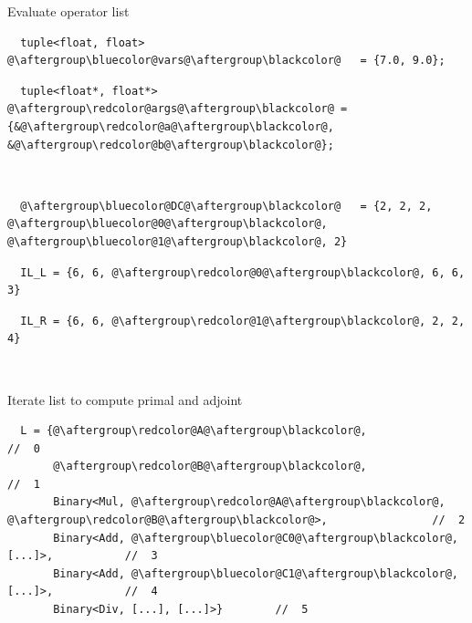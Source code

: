 \documentclass[xcolor=dvipsnames]{beamer}
\begin{document}
\begin{frame}[fragile]{Evaluate operator list}
\begin{lstlisting}
  tuple<float, float> @\aftergroup\bluecolor@vars@\aftergroup\blackcolor@   = {7.0, 9.0};
\end{lstlisting}
\begin{lstlisting}
  tuple<float*, float*> @\aftergroup\redcolor@args@\aftergroup\blackcolor@ = {&@\aftergroup\redcolor@a@\aftergroup\blackcolor@, &@\aftergroup\redcolor@b@\aftergroup\blackcolor@};
\end{lstlisting}

~

\begin{lstlisting}
  @\aftergroup\bluecolor@DC@\aftergroup\blackcolor@   = {2, 2, 2, @\aftergroup\bluecolor@0@\aftergroup\blackcolor@, @\aftergroup\bluecolor@1@\aftergroup\blackcolor@, 2}
\end{lstlisting}
\begin{lstlisting}
  IL_L = {6, 6, @\aftergroup\redcolor@0@\aftergroup\blackcolor@, 6, 6, 3}
\end{lstlisting}
\begin{lstlisting}
  IL_R = {6, 6, @\aftergroup\redcolor@1@\aftergroup\blackcolor@, 2, 2, 4}
\end{lstlisting}

~

Iterate list to compute primal and adjoint
\begin{lstlisting}
  L = {@\aftergroup\redcolor@A@\aftergroup\blackcolor@,                                //  0
       @\aftergroup\redcolor@B@\aftergroup\blackcolor@,                                //  1
       Binary<Mul, @\aftergroup\redcolor@A@\aftergroup\blackcolor@, @\aftergroup\redcolor@B@\aftergroup\blackcolor@>,                //  2
       Binary<Add, @\aftergroup\bluecolor@C0@\aftergroup\blackcolor@, [...]>,           //  3
       Binary<Add, @\aftergroup\bluecolor@C1@\aftergroup\blackcolor@, [...]>,           //  4
       Binary<Div, [...], [...]>}        //  5
\end{lstlisting}
\end{frame}
\end{document}
